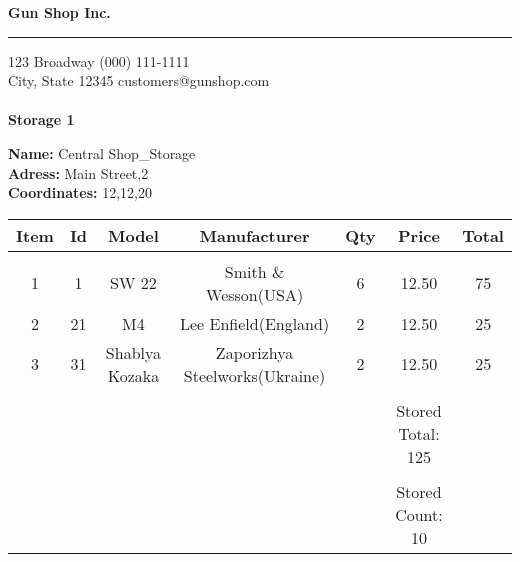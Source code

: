 \documentclass{article}
\begin{document}
\hfil{\Huge\bf Gun Shop Inc.}\hfil
\bigskip
\hrule
\bigskip

123 Broadway \hfill (000) 111-1111 \\
City, State 12345 \hfill customers@gunshop.com\\ \\

\hfill{\bf Storage 1}\hfill
\bigskip

{\bf Name:}   Central Shop\_Storage\\
{\bf Adress:}  Main Street,2 \\
{\bf Coordinates:}  12,12,20 \\ 
\begin{center}
\begin{tabular}{ c c c c c c c }
  Item & Id & Model & Manufacturer & Qty & Price & Total  \\[2ex]
\hline\\
 1 & 1 & SW 22& Smith \& Wesson(USA)& 6 & 12.50 & 75 \\ [2ex] 2 & 21 & M4& Lee Enfield(England)& 2 & 12.50 & 25 \\ [2ex] 3 & 31 & Shablya Kozaka& Zaporizhya Steelworks(Ukraine)& 2 & 12.50 & 25 \\ [2ex]\hline\\&&&&&Stored Total: 125&\\[2ex]\hline\\&&&&&Stored Count: 10&\\[2ex]\end{tabular}\end{center}
\end{document}
